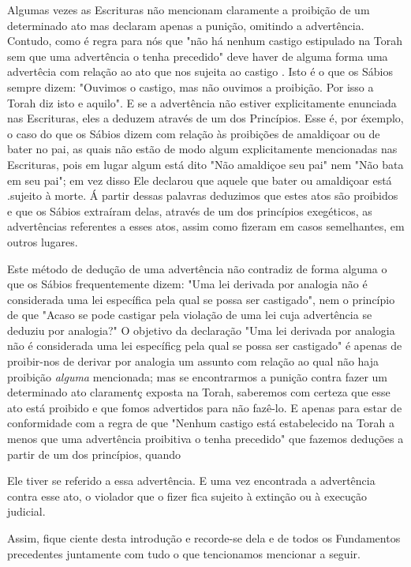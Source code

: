 \begin{itemize}
\begin{enumrate}
\begin{itemize}
Algumas vezes as Escrituras não mencionam claramente a proibição de um
determinado ato mas declaram apenas a punição, omitindo a advertên­cia.
Contudo, como é regra para nós que "não há nenhum castigo estipulado na
Torah sem que uma advertência o tenha precedido" deve haver de alguma
forma uma advertêcia com relação ao ato que nos sujeita ao castigo .
Isto é o que os Sábios sempre dizem: "Ouvimos o castigo, mas não ouvimos
a proibi­ção. Por isso a Torah diz isto e aquilo". E se a advertência
não estiver explicita­mente enunciada nas Escrituras, eles a deduzem
através de um dos Princípios. Esse é, por éxemplo, o caso do que os
Sábios dizem com relação às proibições de amaldiçoar ou de bater no pai,
as quais não estão de modo algum explicita­mente mencionadas nas
Escrituras, pois em lugar algum está dito "Não amaldi­çoe seu pai" nem
"Não bata em seu pai"; em vez disso Ele declarou que aquele que bater ou
amaldiçoar está .sujeito à morte. Á partir dessas palavras deduzi­mos
que estes atos são proibidos e que os Sábios extraíram delas, através de
um dos princípios exegéticos, as advertências referentes a esses atos,
assim co­mo fizeram em casos semelhantes, em outros lugares.

Este método de dedução de uma advertência não contradiz de for­ma alguma
o que os Sábios frequentemente dizem: "Uma lei derivada por ana­logia
não é considerada uma lei específica pela qual se possa ser castigado",
nem o princípio de que "Acaso se pode castigar pela violação de uma lei
cuja advertência se deduziu por analogia?" O objetivo da declaração "Uma
lei deri­vada por analogia não é considerada uma lei específicg pela
qual se possa ser castigado" é apenas de proibir-nos de derivar por
analogia um assunto com re­lação ao qual não haja proibição
\emph{alguma} mencionada; mas se encontrarmos a punição contra fazer um
determinado ato claramentç exposta na Torah, sabe­remos com certeza que
esse ato está proibido e que fomos advertidos para não fazê-lo. E apenas
para estar de conformidade com a regra de que "Nenhum cas­tigo está
estabelecido na Torah a menos que uma advertência proibitiva o te­nha
precedido" que fazemos deduções a partir de um dos princípios, quando


Ele tiver se referido a essa advertência. E uma vez encontrada a
advertência contra
esse ato, o violador que o fizer fica sujeito à extinção ou à
execução judicial.


Assim, fique ciente desta introdução e recorde-se dela e de todos os
Fundamentos precedentes juntamente com tudo o que tencionamos mencio­nar
a seguir.


\end{itemize}
\end{enumrate}
\end{itemize}
